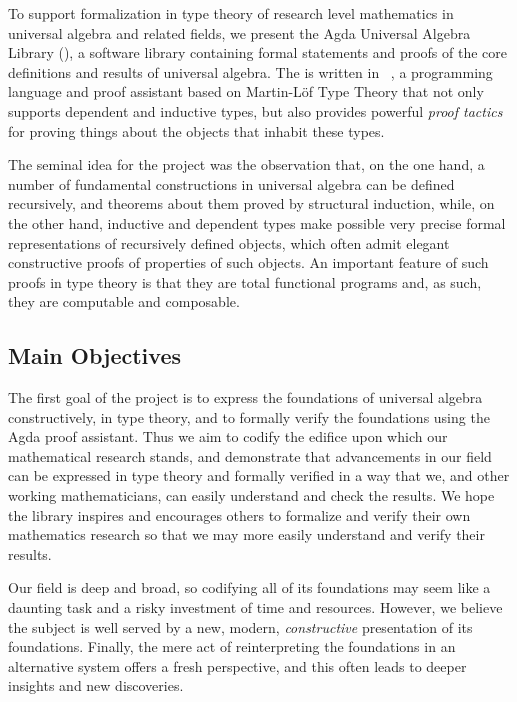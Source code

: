 To support formalization in type theory of research level mathematics in universal algebra and related fields, we present the Agda Universal Algebra Library (\ualib), a software library containing formal statements and proofs of the core definitions and results of universal algebra.
The \ualib is written in \agda~\cite{Norell:2009}, a programming language and proof assistant based on Martin-L\"of Type Theory that not only supports dependent and inductive types, but also provides powerful \emph{proof tactics} for proving things about the objects that inhabit these types.


The seminal idea for the \agdaualib project was the observation that, on the one hand, a number of fundamental constructions in universal algebra can be defined recursively, and theorems about them proved by structural induction, while, on the other hand, inductive and dependent types make possible very precise formal representations of recursively defined objects, which often admit elegant constructive proofs of properties of such objects.  An important feature of such proofs in type theory is that they are total functional programs and, as such, they are computable and composable.

\subsection*{Main Objectives}
The first goal of the project is to express the foundations of universal algebra constructively, in type theory, and to formally verify the foundations using the Agda proof assistant. Thus we aim to codify the edifice upon which our mathematical research stands, and demonstrate that advancements in our field can be expressed in type theory and formally verified in a way that we, and other working mathematicians, can easily understand and check the results. We hope the library inspires and encourages others to formalize and verify their own mathematics research so that we may more easily understand and verify their results.

Our field is deep and broad, so codifying all of its foundations may seem like a daunting task and a risky investment of time and resources. However, we believe the subject is well served by a new, modern, \emph{constructive} presentation of its foundations.  Finally, the mere act of reinterpreting the foundations in an alternative system offers a fresh perspective, and this often leads to deeper insights and new discoveries.

